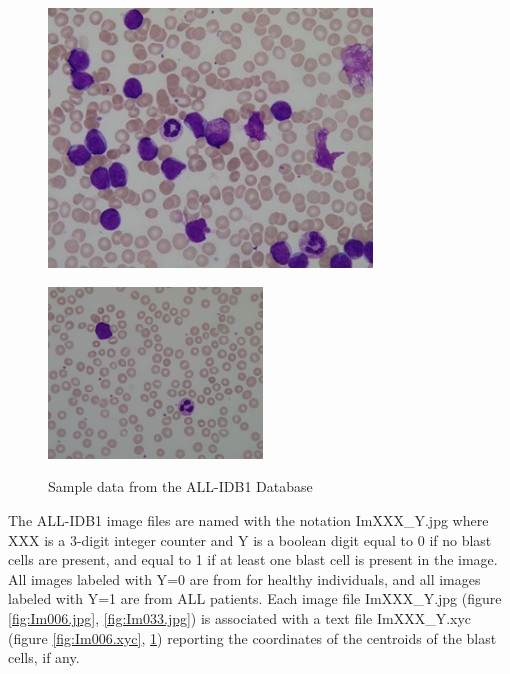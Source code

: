 \begin{figure}[H]
\begin{minipage}[b]{0.35\linewidth}
\centering
\includegraphics{../images/Im006_1.jpg}
\label{fig:Im006.jpg}
\end{minipage}
\hfill
\begin{minipage}[b]{0.3\linewidth}
\centering

\label{fig:Im006.xyc}
\end{minipage}

\begin{minipage}[b]{0.35\linewidth}
\centering
\includegraphics[width=57mm]{../images/Im033_1.jpg}
\label{fig:Im033.jpg}
\end{minipage}
\hfill
\begin{minipage}[b]{0.3\linewidth}
\centering

\label{fig:Im033.xyc}
\end{minipage}
\caption{Sample data from the ALL-IDB1 Database}
\end{figure}

The ALL-IDB1 image files are named with the notation ImXXX\_Y.jpg where XXX is a 3-digit integer counter and Y is a boolean digit equal to 0 if no blast cells are present, and equal to 1 if at least one blast cell is present in the image. All images labeled with Y=0 are from for healthy individuals, and all images labeled with Y=1 are from ALL patients. Each image file ImXXX\_Y.jpg (figure \ref{fig:Im006.jpg}, \ref{fig:Im033.jpg}) is associated with a text file ImXXX\_Y.xyc (figure \ref{fig:Im006.xyc}, \ref{fig:Im033.xyc}) reporting the coordinates of the centroids of the blast cells, if any. \\

